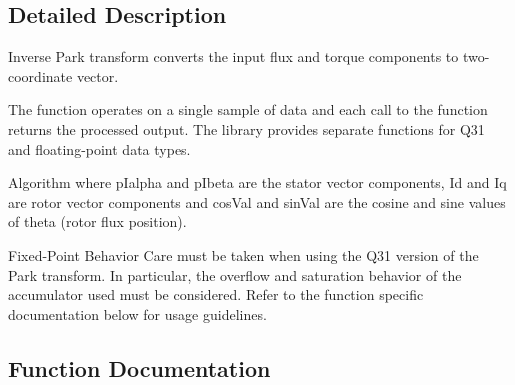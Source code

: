 \subsection{Detailed Description}
Inverse Park transform converts the input flux and torque components to two-\/coordinate vector.

The function operates on a single sample of data and each call to the function returns the processed output. The library provides separate functions for Q31 and floating-\/point data types. \begin{DoxyParagraph}{Algorithm}
 where {\ttfamily p\+Ialpha} and {\ttfamily p\+Ibeta} are the stator vector components, {\ttfamily Id} and {\ttfamily Iq} are rotor vector components and {\ttfamily cos\+Val} and {\ttfamily sin\+Val} are the cosine and sine values of theta (rotor flux position). 
\end{DoxyParagraph}
\begin{DoxyParagraph}{Fixed-\/\+Point Behavior}
Care must be taken when using the Q31 version of the Park transform. In particular, the overflow and saturation behavior of the accumulator used must be considered. Refer to the function specific documentation below for usage guidelines. 
\end{DoxyParagraph}


\subsection{Function Documentation}
\mbox{\label{group__inv__park_ga7ca3a87a0954ed8c9ed5a2e6f1c64f30}} 
